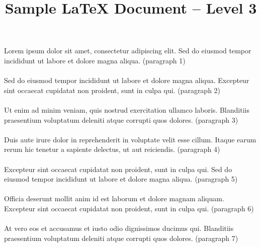 \documentclass{article}
\title{Sample LaTeX Document -- Level 3}
\begin{document}
\maketitle
\paragraph{} Lorem ipsum dolor sit amet, consectetur adipiscing elit. Sed do eiusmod tempor incididunt ut labore et dolore magna aliqua. (paragraph 1)

\paragraph{} Sed do eiusmod tempor incididunt ut labore et dolore magna aliqua. Excepteur sint occaecat cupidatat non proident, sunt in culpa qui. (paragraph 2)

\paragraph{} Ut enim ad minim veniam, quis nostrud exercitation ullamco laboris. Blanditiis praesentium voluptatum deleniti atque corrupti quos dolores. (paragraph 3)

\paragraph{} Duis aute irure dolor in reprehenderit in voluptate velit esse cillum. Itaque earum rerum hic tenetur a sapiente delectus, ut aut reiciendis. (paragraph 4)

\paragraph{} Excepteur sint occaecat cupidatat non proident, sunt in culpa qui. Sed do eiusmod tempor incididunt ut labore et dolore magna aliqua. (paragraph 5)

\paragraph{} Officia deserunt mollit anim id est laborum et dolore magnam aliquam. Excepteur sint occaecat cupidatat non proident, sunt in culpa qui. (paragraph 6)

\paragraph{} At vero eos et accusamus et iusto odio dignissimos ducimus qui. Blanditiis praesentium voluptatum deleniti atque corrupti quos dolores. (paragraph 7)
\end{document}
